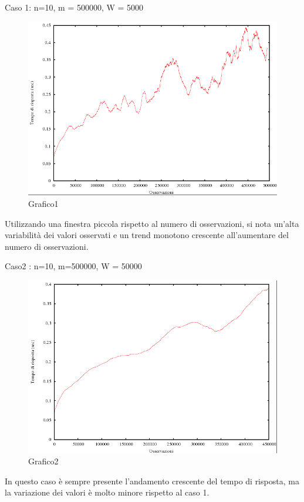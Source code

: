 Caso 1: n=10, m = 500000, W = 5000
\begin{figure}[H]
\begin{center}
\includegraphics[scale=0.5]{etc/grafico1.png}
\caption{Grafico1}
\label{Grafico1}
\end{center}
\end{figure}
Utilizzando una finestra piccola rispetto al numero di osservazioni, si nota un'alta variabilità dei valori osservati e un trend monotono crescente all'aumentare del numero di osservazioni.

Caso2 : n=10, m=500000, W = 50000
\begin{figure}[H]
\begin{center}
\includegraphics[scale=0.5]{etc/grafico2.png}
\caption{Grafico2}
\label{Grafico2}
\end{center}
\end{figure}
In questo caso è sempre presente l'andamento crescente del tempo di risposta, ma la variazione dei valori è molto minore rispetto al caso 1.

